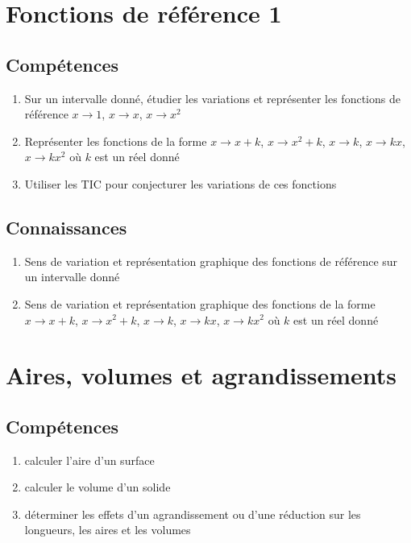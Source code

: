 \documentclass[12pt,a4paper]{article}
\begin{document}
\section{Fonctions de référence 1}
\subsection*{Compétences}
\begin{enumerate}
	\item Sur un intervalle donné, étudier les variations et représenter les fonctions de référence $x \rightarrow 1$, $x \rightarrow x$, $x \rightarrow x^2$
	\item Représenter les fonctions de la forme $x \rightarrow x+k$, $x \rightarrow x^2+k$, $x \rightarrow k$, $x \rightarrow kx$, $x \rightarrow kx^2$ où $k$ est un réel donné
	\item Utiliser les TIC pour conjecturer les variations de ces fonctions
\end{enumerate}

\subsection*{Connaissances}
\begin{enumerate}
	\item Sens de variation et représentation graphique des fonctions de référence sur un intervalle donné
	\item Sens de variation et représentation graphique des fonctions de la forme $x \rightarrow x+k$, $x \rightarrow x^2+k$, $x \rightarrow k$, $x \rightarrow kx$, $x \rightarrow kx^2$ où $k$ est un réel donné
\end{enumerate}


\section{Aires, volumes et agrandissements}

	\subsection*{Compétences}
	\begin{enumerate}
		\item calculer l'aire d'un surface
		\item calculer le volume d'un solide
		\item déterminer les effets d'un agrandissement ou d'une réduction sur les longueurs, les aires et les volumes
	\end{enumerate}
\end{document}
